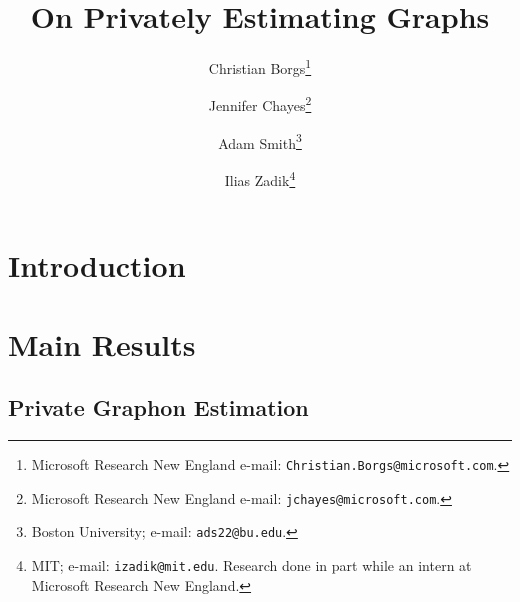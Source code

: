 \documentclass[12pt,a4paper]{article}
\author{
{\sf Christian Borgs}\thanks{Microsoft Research New England e-mail: {\tt Christian.Borgs@microsoft.com}. }
\and
{\sf Jennifer Chayes}\thanks{Microsoft Research New England e-mail: {\tt jchayes@microsoft.com}.}
\and
{\sf Adam Smith}\thanks{Boston University; e-mail: {\tt ads22@bu.edu}. }
\and
{\sf Ilias Zadik}\thanks{MIT; e-mail: {\tt izadik@mit.edu}. Research done in part while an intern at Microsoft Research New England. }
}
\newtheorem{theorem}{Theorem}[section]
\numberwithin{equation}{section}
\numberwithin{equation}{section}
\renewcommand{\epsilon}{\varepsilon}
\newcommand{\1}{{\text{\Large $\mathfrak 1$}}}
\newcommand{\2}[1]{{\text{\Large $\mathfrak 1$}\!\left(#1\right)}}
\begin{document}
\title{On Privately Estimating Graphs}
\date{}

\maketitle

\begin{abstract}

\end{abstract}


\section{Introduction}


\section{Main Results}

\subsection{Private Graphon Estimation}
%
\end{document}
